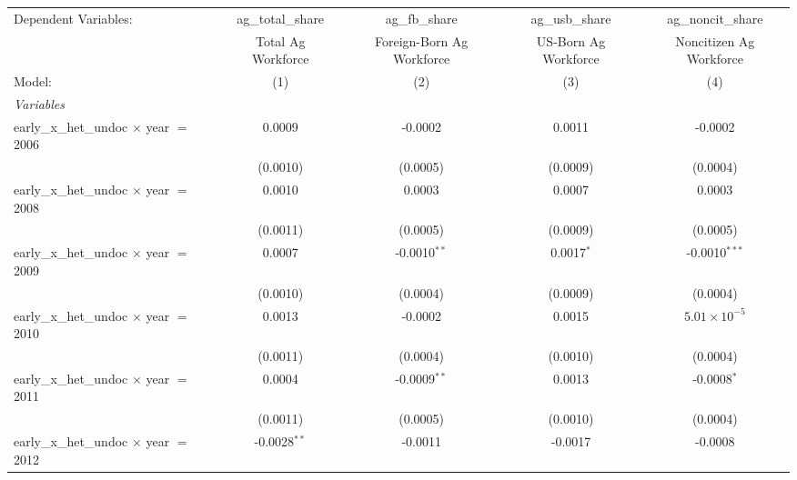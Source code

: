 
\begingroup
\centering
\begin{tabular}{lcccc}
   \tabularnewline \midrule \midrule
   Dependent Variables:                            & ag\_total\_share   & ag\_fb\_share             & ag\_usb\_share         & ag\_noncit\_share\\    
                                                   & Total Ag Workforce & Foreign-Born Ag Workforce & US-Born Ag Workforce   & Noncitizen Ag Workforce \\   
   Model:                                          & (1)                & (2)                       & (3)                    & (4)\\  
   \midrule
   \emph{Variables}\\
   early\_x\_het\_undoc $\times$ year $=$ 2006     & 0.0009             & -0.0002                   & 0.0011                 & -0.0002\\   
                                                   & (0.0010)           & (0.0005)                  & (0.0009)               & (0.0004)\\   
   early\_x\_het\_undoc $\times$ year $=$ 2008     & 0.0010             & 0.0003                    & 0.0007                 & 0.0003\\   
                                                   & (0.0011)           & (0.0005)                  & (0.0009)               & (0.0005)\\   
   early\_x\_het\_undoc $\times$ year $=$ 2009     & 0.0007             & -0.0010$^{**}$            & 0.0017$^{*}$           & -0.0010$^{***}$\\   
                                                   & (0.0010)           & (0.0004)                  & (0.0009)               & (0.0004)\\   
   early\_x\_het\_undoc $\times$ year $=$ 2010     & 0.0013             & -0.0002                   & 0.0015                 & $5.01\times 10^{-5}$\\    
                                                   & (0.0011)           & (0.0004)                  & (0.0010)               & (0.0004)\\   
   early\_x\_het\_undoc $\times$ year $=$ 2011     & 0.0004             & -0.0009$^{**}$            & 0.0013                 & -0.0008$^{*}$\\   
                                                   & (0.0011)           & (0.0005)                  & (0.0010)               & (0.0004)\\   
   early\_x\_het\_undoc $\times$ year $=$ 2012     & -0.0028$^{**}$     & -0.0011                   & -0.0017                & -0.0008\\   

\end{tabular}
